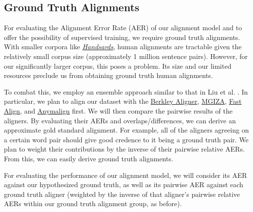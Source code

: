 \documentclass[twoside,twocolumn]{article}
\begin{document}
\subsection{Ground Truth Alignments}
\label{subsec:ground-truth-alignments}

For evaluating the Alignment Error Rate (AER) of our alignment model and to
offer the possibility of supervised training, we require ground truth
alignments. With smaller corpora like
\href{https://www.isi.edu/natural-language/download/hansard/}{\textit{Handsards}},
human alignments are tractable given the relatively small corpus size
(approximately 1 million sentence pairs). However, for our significantly larger
corpus, this poses a problem. Its size and our limited resources preclude us
from obtaining ground truth human alignments.

To combat this, we employ an ensemble approach similar to that in Liu et al.
\cite{liu2015streaming}. In particular, we plan to align our dataset with
the
\href{http://nlp.cs.berkeley.edu/projects/historical.shtml#WordAligner}{Berkley Aligner},
\href{https://clear.colorado.edu/CompSemWiki/index.php/MGIZA\%2B\%2B}{MGIZA},
\href{https://github.com/clab/fast\_align}{Fast Align}, and
\href{https://anymalign.limsi.fr/}{Anymalign} first. We will then compare the
pairwise results of the aligners. By evaluating their AERs and
overlaps/differences, we can derive an approximate gold standard alignment. For
example, all of the aligners agreeing on a certain word pair should give good
credence to it being a ground truth pair. We plan to weight their contributions
by the inverse of their pairwise relative AERs. From this, we can easily derive
ground truth alignments.

For evaluating the performance of our alignment model, we will consider its
AER against our hypothesized ground truth, as well as its pairwise AER against
each ground truth aligner (weighted by the inverse of that aligner's pairwise
relative AERs within our ground truth alignment group, as before).




\end{document}
